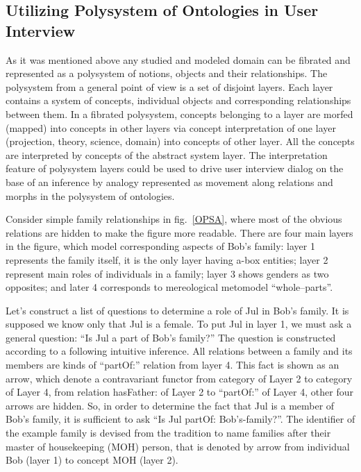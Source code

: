 \documentclass[conference]{IEEEtran}
\begin{document}
{{\subsection{Utilizing Polysystem of Ontologies in User Interview}
As it was mentioned above any studied and modeled domain can be fibrated and represented as a polysystem of notions, objects and their relationships. The polysystem from a general point of view is a set of disjoint layers. Each layer contains a system of concepts, individual objects and corresponding relationships between them. In a fibrated polysystem, concepts belonging to a layer are morfed (mapped) into concepts in other layers via concept interpretation of one layer (projection, theory, science, domain) into concepts of other layer. All the concepts are interpreted by concepts of the abstract system layer. The interpretation feature of polysystem layers could be used to drive user interview dialog on the base of an inference by analogy represented as movement along relations and morphs in the polysystem of ontologies.

Consider simple family relationships in fig.~\ref{OPSA}, where most of the obvious relations are hidden to make the figure more readable. There are four main layers in the figure, which model corresponding aspects of Bob's family: layer 1 represents the family itself, it is the only layer having a-box entities; layer 2 represent main roles of individuals in a family; layer 3 shows genders as two opposites; and later 4 corresponds to mereological metomodel ``whole--parts''.

Let's construct a list of questions to determine a role of Jul in Bob's family. It is supposed we know only that Jul is a female. To put Jul in layer 1, we must ask a general question: ``Is Jul a part of Bob's family?'' The question is constructed according to a following intuitive inference. All relations between a family and its members are kinds of ``partOf:'' relation from layer 4. This fact is shown as an arrow, which denote a contravariant functor from category of Layer 2 to category of Layer 4, from relation hasFather: of Layer 2 to ``partOf:'' of Layer 4, other four arrows are hidden. So, in order to determine the fact that Jul is a member of Bob's family, it is sufficient to ask ``Is Jul partOf: Bob's-family?''. The identifier of the example family is devised from the tradition to name families after their master of housekeeping (MOH) person, that is denoted by arrow from individual Bob (layer 1) to concept MOH (layer 2).

}}
\end{document}
